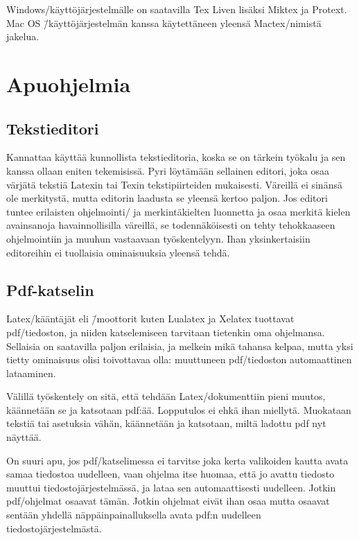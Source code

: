 Windows\-/käyttöjärjestelmälle on saatavilla Tex Liven lisäksi Miktex ja
Protext. Mac OS \=/käyttöjärjestelmän kanssa käytettäneen yleensä
Mactex\-/nimistä jakelua.

\section{Apuohjelmia}

\subsection{Tekstieditori}

Kannattaa käyttää kunnollista tekstieditoria, koska se on tärkein
työkalu ja sen kanssa ollaan eniten tekemisissä. Pyri löytämään
sellainen editori, joka osaa värjätä tekstiä Latexin tai Texin
tekstipiirteiden mukaisesti. Väreillä ei sinänsä ole merkitystä, mutta
editorin laadusta se yleensä kertoo paljon. Jos editori tuntee
erilaisten ohjelmointi\-/{} ja merkintäkielten luonnetta ja osaa merkitä
kielen avainsanoja havainnollisilla väreillä, se todennäköisesti on
tehty tehokkaaseen ohjelmointiin ja muuhun vastaavaan työskentelyyn.
Ihan yksinkertaisiin editoreihin ei tuollaisia ominaisuuksia yleensä
tehdä.

\subsection{Pdf-katselin}

Latex\-/kääntäjät eli \=/moottorit kuten Lualatex ja Xelatex tuottavat
pdf\-/tiedoston, ja niiden katselemiseen tarvitaan tietenkin oma
ohjelmansa. Sellaisia on saatavilla paljon erilaisia, ja melkein mikä
tahansa kelpaa, mutta yksi tietty ominaisuus olisi toivottavaa olla:
muuttuneen pdf\-/tiedoston automaattinen lataaminen.

Välillä työskentely on sitä, että tehdään Latex\-/dokumenttiin pieni
muutos, käännetään se ja katsotaan pdf:ää. Lopputulos ei ehkä ihan
miellytä. Muokataan tekstiä tai asetuksia vähän, käännetään ja
katsotaan, miltä ladottu pdf nyt näyttää.

On suuri apu, jos pdf\-/katselimessa ei tarvitse joka kerta valikoiden
kautta avata samaa tiedostoa uudelleen, vaan ohjelma itse huomaa, että
jo avattu tiedosto muuttui tiedostojärjestelmässä, ja lataa sen
automaattisesti uudelleen. Jotkin pdf\-/ohjelmat osaavat tämän. Jotkin
ohjelmat eivät ihan osaa mutta osaavat sentään yhdellä
näppäinpainalluksella avata pdf:n uudelleen tiedostojärjestelmästä.

